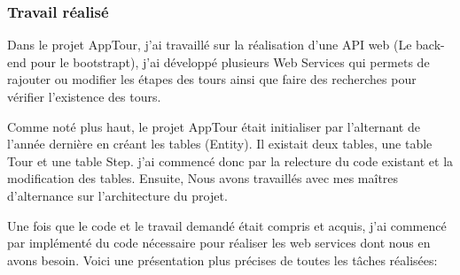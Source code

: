 \documentclass[12pt]{article}
\begin{document}
\newpage

\subsubsection{Travail réalisé}

Dans le projet AppTour, j'ai travaillé sur la réalisation d'une API web (Le back-end pour le bootstrapt), j'ai développé plusieurs Web Services qui permets de rajouter ou modifier les étapes des tours ainsi que faire des recherches pour vérifier l’existence des tours. 

Comme noté plus haut, le projet AppTour était initialiser par l'alternant de l'année dernière en créant les tables (Entity). Il existait deux tables, une table Tour et une table Step. j'ai commencé donc par la relecture du code existant et la modification des tables.
Ensuite, Nous avons travaillés avec mes maîtres d'alternance sur l'architecture du projet.

Une fois que le code et le travail demandé était compris et acquis, j'ai commencé par implémenté du code nécessaire pour réaliser les web services dont nous en avons besoin. Voici une présentation plus précises de toutes les tâches réalisées:   
\end{document}
